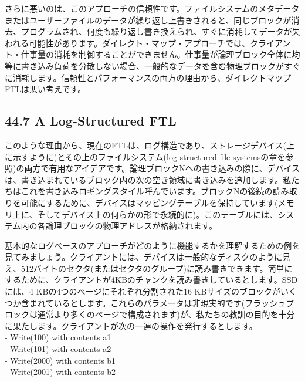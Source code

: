 さらに悪いのは、このアプローチの信頼性です。ファイルシステムのメタデータまたはユーザーファイルのデータが繰り返し上書きされると、同じブロックが消去、プログラムされ、何度も繰り返し書き換えられ、すぐに消耗してデータが失われる可能性があります。ダイレクト・マップ・アプローチでは、クライアント・仕事量の消耗を制御することができません。仕事量が論理ブロック全体に均等に書き込み負荷を分散しない場合、一般的なデータを含む物理ブロックがすぐに消耗します。信頼性とパフォーマンスの両方の理由から、ダイレクトマップFTLは悪い考えです。

\hypertarget{a-log-structured-ftl}{%
\subsection*{44.7 A Log-Structured FTL}\label{a-log-structured-ftl}}

このような理由から、現在のFTLは、ログ構造であり、ストレージデバイス(上に示すように)とその上のファイルシステム(log
structured file
systemsの章を参照)の両方で有用なアイデアです。論理ブロックNへの書き込みの際に、デバイスは、書き込まれているブロック内の次の空き領域に書き込みを追加します。私たちはこれを書き込みロギングスタイル呼んでいます。ブロックNの後続の読み取りを可能にするために、デバイスはマッピングテーブルを保持しています(メモリ上に、そしてデバイス上の何らかの形で永続的に)。このテーブルには、システム内の各論理ブロックの物理アドレスが格納されます。

基本的なログベースのアプローチがどのように機能するかを理解するための例を見てみましょう。クライアントには、デバイスは一般的なディスクのように見え、512バイトのセクタ(またはセクタのグループ)に読み書きできます。簡単にするために、クライアントが4KBのチャンクを読み書きしているとします。SSDには、4
KBの4つのページにそれぞれ分割された16
KBサイズのブロックがいくつか含まれているとします。これらのパラメータは非現実的です(フラッシュブロックは通常より多くのページで構成されます)が、私たちの教訓の目的を十分に果たします。クライアントが次の一連の操作を発行するとします。\\
- Write(100) with contents a1\\
- Write(101) with contents a2\\
- Write(2000) with contents b1\\
- Write(2001) with contents b2

